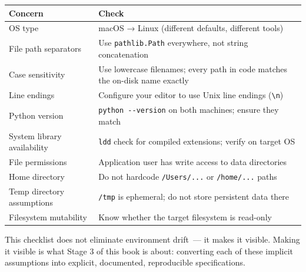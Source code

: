 
{\def\LTcaptype{none} %
\begin{longtable}[]{@{}
  >{\raggedright\arraybackslash}p{}
  >{\raggedright\arraybackslash}p{}@{}}
\toprule\noalign{}
\begin{minipage}[b]{\linewidth}\raggedright
Concern
\end{minipage} & \begin{minipage}[b]{\linewidth}\raggedright
Check
\end{minipage} \\
\midrule\noalign{}
\endhead
\bottomrule\noalign{}
\endlastfoot
OS type & macOS → Linux (different defaults, different tools) \\
File path separators & Use \texttt{pathlib.Path} everywhere, not string concatenation \\
Case sensitivity & Use lowercase filenames; every path in code matches the on-disk name exactly \\
Line endings & Configure your editor to use Unix line endings (\texttt{\textbackslash{}n}) \\
Python version & \texttt{python\ -\/-version} on both machines; ensure they match \\
System library availability & \texttt{ldd} check for compiled extensions; verify on target OS \\
File permissions & Application user has write access to data directories \\
Home directory & Do not hardcode \texttt{/Users/...} or \texttt{/home/...} paths \\
Temp directory assumptions & \texttt{/tmp} is ephemeral; do not store persistent data there \\
Filesystem mutability & Know whether the target filesystem is read-only \\
\end{longtable}
}

This checklist does not eliminate environment drift~--- it makes it visible. Making it visible is what Stage 3 of this book is about: converting each of these implicit assumptions into explicit, documented, reproducible specifications.

